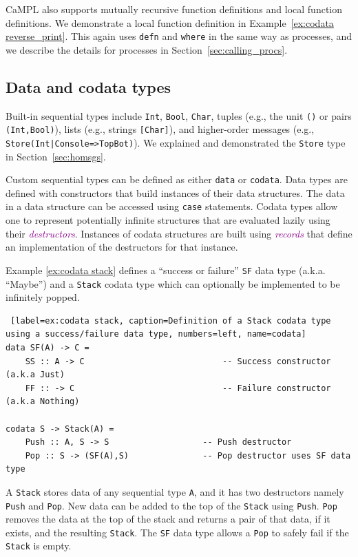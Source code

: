 \documentclass[acmsmall]{acmart}
\newcommand{\tc}[1]{\textcolor{darkMagenta}{\textit{#1}}}
\begin{document}
CaMPL also supports mutually recursive function definitions and local function definitions. 
We demonstrate a local function definition in Example~\ref{ex:codata reverse_print}.
This again uses \lstinline$defn$ and \lstinline$where$ in the same way as processes, and we describe the details for processes in Section~\ref{sec:calling_procs}.

\subsection{Data and codata types}
Built-in sequential types include \lstinline$Int$, \lstinline$Bool$, \lstinline$Char$, tuples (e.g., the unit \lstinline$()$ or pairs \lstinline$(Int,Bool)$), lists (e.g., strings \lstinline$[Char]$), and higher-order messages (e.g., \lstinline$Store(Int|Console=>TopBot)$).
We explained and demonstrated the \lstinline$Store$ type in Section~\ref{sec:homsgs}.

Custom sequential types can be defined as either \lstinline{data} or \lstinline{codata}. 
Data types are defined with constructors that build instances of their data structures.
The data in a data structure can be accessed using \lstinline$case$ statements.
Codata types allow one to represent potentially infinite structures that are evaluated lazily using their \tc{destructors}.
Instances of codata structures are built using \tc{records} that define an implementation of the destructors for that instance.

Example \ref{ex:codata stack} defines a ``success or failure'' \lstinline{SF} data type (a.k.a. ``Maybe'') and a \lstinline{Stack} codata type which can optionally be implemented to be infinitely popped.
\begin{lstlisting} [label=ex:codata stack, caption=Definition of a Stack codata type using a success/failure data type, numbers=left, name=codata]
data SF(A) -> C =
	SS :: A -> C  							-- Success constructor (a.k.a Just)
	FF :: -> C    							-- Failure constructor (a.k.a Nothing)

codata S -> Stack(A) = 
	Push :: A, S -> S 					-- Push destructor
	Pop :: S -> (SF(A),S)				-- Pop destructor uses SF data type
\end{lstlisting}  
A \lstinline{Stack} stores data of any sequential type \lstinline$A$, and it has two destructors namely \lstinline$Push$ and \lstinline$Pop$. 
New data can be added to the top of the \lstinline{Stack} using \lstinline$Push$.
\lstinline$Pop$ removes the data at the top of the stack and returns a pair of that data, if it exists, and the resulting \lstinline{Stack}.
The \lstinline{SF} data type allows a \lstinline$Pop$ to safely fail if the \lstinline{Stack} is empty.
\end{document}
